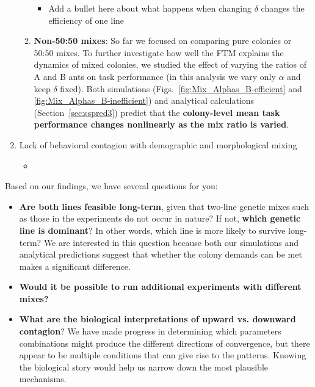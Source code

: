 \documentclass[11pt]{article}
\begin{document}
\begin{enumerate}
\begin{enumerate}
\begin{itemize}
        \item
        {\color{red}Add a bullet here about what happens when changing $\delta$ changes the efficiency of one line}
        
    \end{itemize}
    \vspace{10pt}
    
    \item \textbf{Non-50:50 mixes}: So far we focused on comparing pure colonies or 50:50 mixes. To further investigate how well the FTM explains the dynamics of mixed colonies, we studied the effect of varying the ratios of A and B ants on task performance (in this analysis we vary only $\alpha$ and keep $\delta$ fixed).
    Both simulations (Figs.~\ref{fig:Mix_Alphas_B-efficient} and \ref{fig:Mix_Alphas_B-inefficient}) and analytical calculations (Section~\ref{sec:sspred3}) predict that the \textbf{colony-level mean task performance changes nonlinearly as the mix ratio is varied}.
    
    \end{enumerate}
    
    \item Lack of behavioral contagion with demographic and morphological mixing
    \begin{itemize}
        \item 
    \end{itemize}

\end{enumerate}

\noindent Based on our findings, we have several questions for you:
\begin{itemize}
    \item \textbf{Are both lines feasible long-term}, given that two-line genetic mixes such as those in the experiments do not occur in nature? If not, \textbf{which genetic line is dominant}? In other words, which line is more likely to survive long-term? We are interested in this question because both our simulations and analytical predictions suggest that whether the colony demands can be met makes a significant difference.
    
    \item \textbf{Would it be possible to run additional experiments with different mixes?} 
    
    \item \textbf{What are the biological interpretations of upward vs. downward contagion}? We have made progress in determining which parameters combinations might produce the different directions of convergence, but there appear to be multiple conditions that can give rise to the patterns. Knowing the biological story would help us narrow down the most plausible mechanisms.
\end{itemize}
\end{document}
